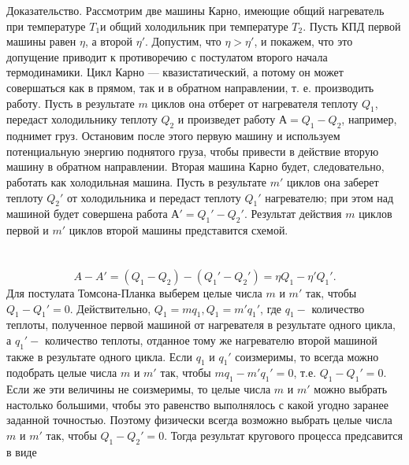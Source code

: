 \documentclass[14pt,a4paper]{scrartcl}
\begin{document}
		\quad Доказательство. Рассмотрим две машины Карно, имеющие общий нагреватель при температуре $T_1$и общий холодильник при температуре $T_2$. Пусть КПД первой машины равен $\eta$, а второй $\eta'$. Допустим, что $\eta > \eta'$, и покажем, что это допущение приводит к противоречию с постулатом второго начала термодинамики. Цикл Карно —  квазистатический, а потому он может совершаться как в прямом, так и в обратном направлении, т. е. производить работу. Пусть в результате $m$ циклов она отберет от нагревателя теплоту $Q_1$, передаст холодильнику теплоту $Q_2$ и произведет работу $А =	Q_1 -Q_2$, например, поднимет груз. Остановим после этого первую машину и используем потенциальную энергию поднятого груза, чтобы привести в действие вторую машину в обратном направлении. Вторая машина Карно будет, следовательно, работать как холодильная машина. Пусть в результате $m'$ циклов она заберет теплоту $Q_2'$ от холодильника и передаст теплоту $Q_1'$ нагревателю; при этом над машиной будет совершена работа $А' =	Q_1' -Q_2'$. Результат действия $m$ циклов первой и $m'$ циклов второй машины представится схемой.\\
		\\
		\\
		 $$A-A' = (Q_1 -Q_2) - (Q_1'-Q_2') = \eta Q_1 - \eta' Q_1'.$$
		\quad Для постулата Томсона-Планка выберем целые числа $m$ и $m'$ так, чтобы $Q_1 - Q_1'=0$. Действительно, $Q_1 = mq_1, Q_1 = m'q_1'$, где $q_1 - $ количество теплоты, полученное первой машиной от нагревателя в результате одного цикла, а $q_1' - $ количество теплоты, отданное тому же нагревателю второй машиной также в результате одного цикла. Если $q_1$ и $q_1'$ соизмеримы, то всегда можно подобрать целые числа $m$ и $ m' $ так, чтобы $ mq_1 - m'q_1' = 0 $, т.е. $ Q_1 - Q_1' = 0 $. Если же эти величины не соизмеримы, то целые числа $m$ и $ m' $ можно выбрать настолько большими, чтобы это равенство выполнялось с какой угодно заранее заданной точностью. Поэтому физически всегда возможно выбрать целые числа $m$ и $ m' $ так, чтобы $ Q_1 - Q_2' =0 $. Тогда результат кругового процесса предсавится в виде\\
		\\
		\\
		\\
		
\end{document}
